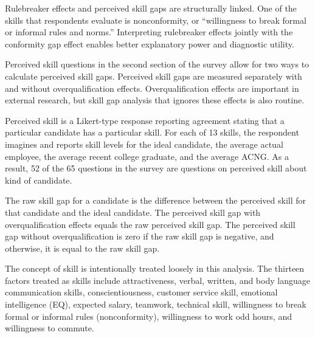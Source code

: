Rulebreaker effects and perceived skill gaps are structurally linked.
One of the skills that respondents evaluate is nonconformity, or ``willingness to break formal or informal rules and norms.''
Interpreting rulebreaker effects jointly with the conformity gap effect
enables better explanatory power and diagnostic utility.

Perceived skill questions in the second section of the survey allow for two ways to calculate perceived skill gaps.
Perceived skill gaps are measured separately with and without overqualification effects.
Overqualification effects are important in external research\cite{green2007there, raybould2005over}, but skill gap analysis that ignores these effects is also routine\cite{blake_2018}.

Perceived skill is a Likert-type response reporting agreement stating that a particular candidate has a particular skill.
For each of 13 skills, the respondent imagines and reports skill levels for the ideal candidate,
the average actual employee,
the average recent college graduate,
and the average ACNG.
As a result, 52 of the 65 questions in the survey are questions on perceived skill about kind of candidate.

The raw skill gap for a candidate is the difference between the perceived skill for that candidate and the ideal candidate.
The perceived skill gap with overqualification effects equals the raw perceived skill gap.
The perceived skill gap without overqualification is zero if the raw skill gap is negative,
and otherwise, it is equal to the raw skill gap.

The concept of skill is intentionally treated loosely in this analysis.
The thirteen factors treated as skills include
attractiveness,
verbal, written, and body language communication skills,
conscientiousness,
customer service skill,
emotional intelligence (EQ),
expected salary,
teamwork,
technical skill,
willingness to break formal or informal rules (nonconformity),
willingness to work odd hours,
and willingness to commute.

